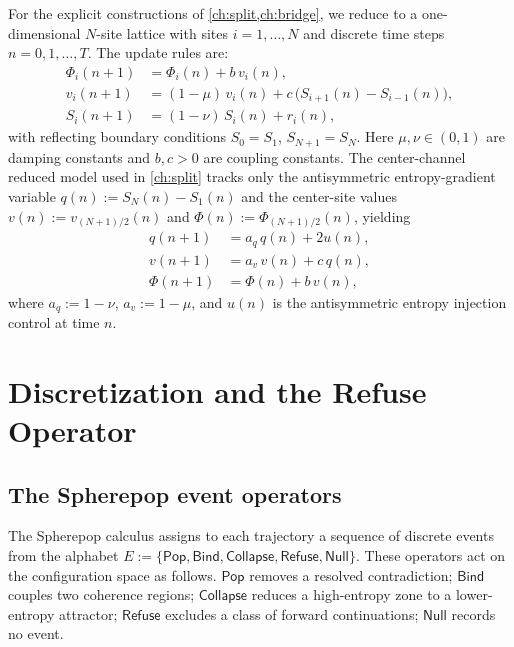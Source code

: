 \documentclass[12pt, oneside]{memoir}
\newcommand{\aq}{a_q}
\newcommand{\av}{a_v}
\begin{document}
For the explicit constructions of \cref{ch:split,ch:bridge}, we reduce to a
one-dimensional $N$-site lattice with sites $i = 1, \dots, N$ and discrete time steps
$n = 0, 1, \dots, T$.  The update rules are:
\begin{align}
  \Phi_i(n+1) &= \Phi_i(n) + b\, v_i(n), \label{eq:lat-phi}\\
  v_i(n+1)   &= (1-\mu)\, v_i(n) + c\, \bigl(S_{i+1}(n) - S_{i-1}(n)\bigr),
  \label{eq:lat-v}\\
  S_i(n+1)   &= (1-\nu)\, S_i(n) + r_i(n), \label{eq:lat-S}
\end{align}
with reflecting boundary conditions $S_0 = S_1$, $S_{N+1} = S_N$.  Here
$\mu, \nu \in (0,1)$ are damping constants and $b, c > 0$ are coupling constants.
The center-channel reduced model used in \cref{ch:split} tracks only the antisymmetric
entropy-gradient variable $q(n) := S_{N}(n) - S_1(n)$ and the center-site values
$v(n) := v_{(N+1)/2}(n)$ and $\Phi(n) := \Phi_{(N+1)/2}(n)$, yielding
\begin{align}
  q(n+1)    &= \aq\, q(n) + 2u(n), \label{eq:red-q}\\
  v(n+1)    &= \av\, v(n) + c\, q(n), \label{eq:red-v}\\
  \Phi(n+1) &= \Phi(n) + b\, v(n), \label{eq:red-phi}
\end{align}
where $\aq := 1-\nu$, $\av := 1-\mu$, and $u(n)$ is the antisymmetric entropy injection
control at time $n$.

\chapter{Discretization and the Refuse Operator}
\label{ch:refuse}

\section{The Spherepop event operators}

The Spherepop calculus assigns to each trajectory a sequence of discrete events from the
alphabet $E := \{\mathsf{Pop}, \mathsf{Bind}, \mathsf{Collapse}, \mathsf{Refuse},
\mathsf{Null}\}$.  These operators act on the configuration space as follows.
$\mathsf{Pop}$ removes a resolved contradiction; $\mathsf{Bind}$ couples two coherence
regions; $\mathsf{Collapse}$ reduces a high-entropy zone to a lower-entropy attractor;
$\mathsf{Refuse}$ excludes a class of forward continuations; $\mathsf{Null}$ records no
event.
\end{document}
